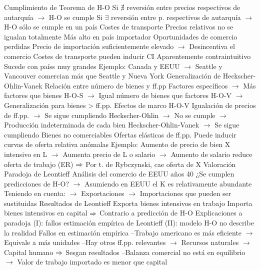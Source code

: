 \documentclass{nuevotema}
\begin{document}
\begin{esquemal}
				\4 Cumplimiento de Teorema de H-O
				\4[] Si $\nexists$ reversión entre precios respectivos de autarquía
				\4[] $\to$ H-O se cumple
				\4[] Si $\exists$ reversión entre p. respectivos de autarquía
				\4[] $\to$ H-O sólo se cumple en un país
			\3 Costes de transporte
				\4 Precios relativos no se igualan totalmente
				\4[] Más alto en país importador
				\4 Oportunidades de comercio perdidas
				\4[] Precio de importación suficientemente elevado
				\4[] $\to$ Desincentiva el comercio
				\4 Costes de transporte pueden inducir CI
				\4[] Aparentemente contraintuitivo
				\4[] Sucede con paíss muy grandes
				\4[] Ejemplo: Canada y EEUU
				\4[] $\to$ Seattle y Vancouver comercian más que Seattle y Nueva York
			\3 Generalización de Heckscher-Ohlin-Vanek
				\4 Relación entre número de bienes y ff.pp
				\4[] Factores específicos
				\4[] $\to$ Más factores que bienes
				\4[] H-O-S
				\4[] $\to$ Igual número de bienes que factores
				\4[] H-O-V
				\4[] $\to$ Generalización para bienes > ff.pp.
				\4 Efectos de marco H-O-V
				\4[] Igualación de precios de ff.pp.
				\4[] $\to$ Se sigue cumpliendo
				\4[] Heckscher-Ohlin
				\4[] $\to$ No se cumple
				\4[] $\to$ Producción indeterminada de cada bien
				\4[] Heckscher-Ohlin-Vanek
				\4[] $\to$ Se sigue cumpliendo
			\3 Bienes no comerciables
			\3 Ofertas elásticas de ff.pp.
				\4 Puede inducir curvas de oferta relativa anómalas
				\4 Ejemplo:
				\4[] Aumento de precio de bien X intensivo en L
				\4[] $\to$ Aumenta precio de L o salario
				\4[] $\to$ Aumento de salario reduce oferta de trabajo (ER)
				\4[] $\Rightarrow$ Por t. de Rybczynski, cae oferta de X
		\2 Valoración
			\3 Paradoja de Leontieff
				\4 Análisis del comercio de EEUU años 40
				\4[] ¿Se cumplen predicciones de H-O?
				\4[] $\to$ Asumiendo en EEUU el K es relativamente abundante
				\4[] Teniendo en cuenta:
				\4[] $\to$ Exportaciones
				\4[] $\to$ Importaciones que pueden ser sustituidas
				\4 Resultados de Leontieff
				\4[] Exporta bienes intensivos en trabajo
				\4[] Importa bienes intensivos en capital
				\4[] $\Rightarrow$ Contrario a predicción de H-O
				\4 Explicaciones a paradoja
				\4[] (I): fallos estimación empírica de Leontieff
				\4[] (II): modelo H-O no describe la realidad
				\4[I] Fallos en estimación empírica
				\4[] --Trabajo americano es más eficiente
				\4[] $\to$ Equivale a más unidades
				\4[] --Hay otros ff.pp. relevantes
				\4[] $\to$ Recursos naturales
				\4[] $\to$ Capital humano
				\4[] $\Rightarrow$ Sesgan resultados
				\4[] --Balanza comercial no está en equilibrio
				\4[] $\to$ Valor de trabajo importado es menor que capital

\end{esquemal}
\end{document}
